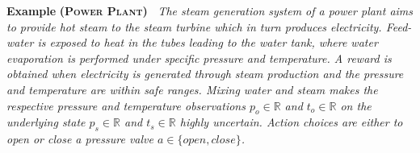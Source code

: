 \documentclass{article} %
\newcommand{\open}{\mathit{open}}
\newcommand{\close}{\mathit{close}}
\begin{document}

\textbf{Example} \textsc{\bf (Power Plant)~\cite{steam2}} \emph{The steam
generation system of a power plant aims to provide hot steam to the
steam turbine which in turn produces electricity. Feed-water is
exposed to heat in the tubes leading to the water tank, where water
evaporation is performed under specific pressure and temperature.
A reward is obtained when electricity is generated through steam
production and the pressure and temperature are within safe ranges.
Mixing water and steam makes the
respective pressure and temperature observations $p_o \in \mathbb{R}$
and $t_o \in \mathbb{R}$ on the underlying state $p_s \in \mathbb{R}$
and $t_s \in \mathbb{R}$ highly uncertain.  Action choices are either
to open or close a pressure valve $a \in \{ \open, \close \}$.}
\end{document}
